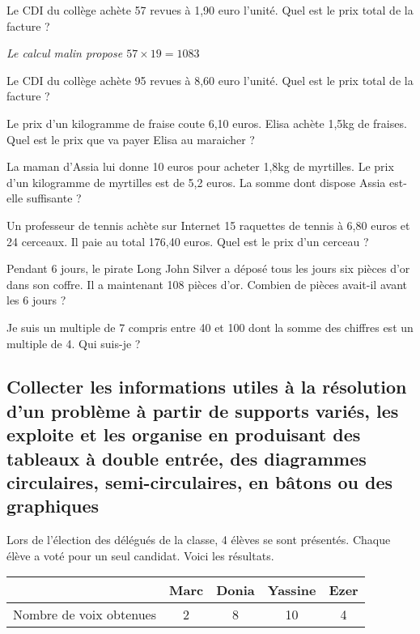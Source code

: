 
Le CDI du collège achète 57 revues à 1,90 euro l'unité. Quel est le prix total de la facture ?

\textit{Le calcul malin propose $57 \times 19 = 1083$}  



Le CDI du collège achète 95 revues à 8,60 euro l'unité. Quel est le prix total de la facture ?



Le prix d'un kilogramme de fraise coute 6,10 euros. Elisa achète 1,5kg de fraises. Quel est le prix que va payer Elisa au maraicher ?



La maman d'Assia lui donne 10 euros pour acheter 1,8kg de myrtilles. Le prix d'un kilogramme de myrtilles est de 5,2 euros. La somme dont dispose Assia est-elle suffisante  ?




Un professeur de tennis achète sur Internet 15 raquettes de tennis à 6,80 euros et 24 cerceaux. Il paie au total 176,40 euros. Quel est le prix d'un cerceau  ?



Pendant 6 jours, le pirate Long John Silver a déposé tous les jours six pièces d'or dans son coffre. Il a maintenant 108 pièces d'or.
Combien de pièces avait-il avant les 6 jours  ?

Je suis un multiple de 7 compris entre 40 et 100 dont la somme des chiffres est un multiple 
de 4. Qui suis-je ?


\subsection{Collecter les informations utiles à la résolution d'un problème à partir de supports variés, les exploite et les organise en produisant des tableaux à double entrée, des diagrammes circulaires, semi-circulaires, en bâtons ou des graphiques}




Lors de l'élection des délégués de la classe, 4 élèves se sont présentés. Chaque élève a voté pour un seul candidat. Voici les résultats.

\begin{tabular}{|c|c|c|c|c|}
\hline 
  & Marc & Donia & Yassine & Ezer \\ 
\hline 
Nombre de voix obtenues & 2 & 8 & 10 & 4 \\ 
\hline 
\end{tabular} 


